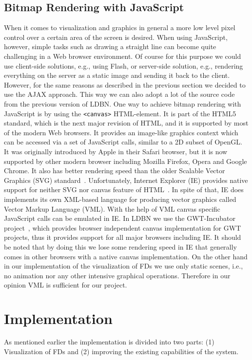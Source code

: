 \subsection{Bitmap Rendering with JavaScript}
\label{sec:renderingJS}
When it comes to visualization and graphics in general a more low level 
pixel control over a certain area of the screen is desired. 
When using JavaScript, however, simple tasks such as drawing a straight
line can become quite challenging in a Web browser environment.
Of course for this purpose we could use client-side solutions, e.g., 
using Flash, or server-side solution, e.g., 
rendering everything on the server as a static image 
and sending it back
to the client. However, for the same reasons as described in the previous
section we decided to use the AJAX approach. This way we can also
adopt a lot of the source code from the previous version of LDBN. 
One way to achieve bitmap rendering with JavaScript is by
using the \verb=<canvas>= HTML-element. 
It is part of the HTML5~\cite{html5} standard, which is the next major revision of HTML, and it is supported by
most of the modern Web browsers. It provides an image-like 
graphics context which can be accessed via a set of JavaScript calls, 
similar to a 2D subset of OpenGL. 
It was originally introduced by Apple in their Safari browser, but it is now 
supported by other modern browser including Mozilla Firefox, Opera and Google Chrome.
It also has better rendering speed than the older Scalable Vector Graphics (SVG) standard~\cite{w8}. 
Unfortunately, Internet Explorer (IE) provides native support for 
neither SVG nor canvas feature of HTML~\cite{w9}. In spite of that, IE does 
implements its own XML-based language for producing vector graphics 
called Vector Markup Language (VML). With the help of VML canvas specific JavaScript 
calls can be emulated in IE. In LDBN we use the GWT-Incubator project~\cite{gwtincubator}, which provides
browser independent canvas implementation for GWT projects, thus 
it provides support for all major browsers including IE. 
It should be noted that by doing this
we lose some rendering speed in IE that generally comes in other browsers
with a native canvas implementation. 
On the other hand in our implementation of the visualization of FDs we use only static scenes, i.e., 
no animation nor any other intensive 
graphical operations. Therefore in our opinion VML is sufficient for our project. 

\section{Implementation}
\label{sec:implementation}
As mentioned earlier the implementation is divided into two parts: 
(1) Visualization of FDs and 
(2) improving the existing capabilities of the system.


